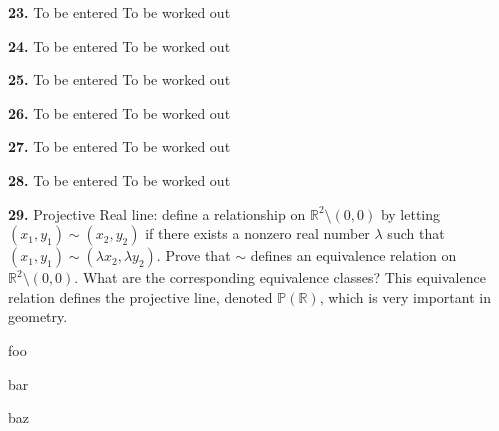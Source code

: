 \documentclass[12pt]{amsart}
\newenvironment{statement}[1]{\smallskip\noindent\color[rgb]{1.00,0.00,0.50} {\bf #1.}}{}
\theoremstyle{definition}
\theoremstyle{remark}
\newcommand{\BR}{\mathbb R}
\begin{document}
\begin{statement}{23}
To be entered
\end{statement}
To be worked out


\begin{statement}{24}
To be entered
\end{statement}
To be worked out


\begin{statement}{25}
To be entered
\end{statement}
To be worked out


\begin{statement}{26}
To be entered
\end{statement}
To be worked out


\begin{statement}{27}
To be entered
\end{statement}
To be worked out


\begin{statement}{28}
To be entered
\end{statement}
To be worked out


\begin{statement}{29}
Projective Real line: define a relationship on $\BR^2 \setminus (0,0)$
by letting $(x_1,y_1) \sim (x_2,y_2)$ if there exists a nonzero real
number $\lambda$ such that $(x_1,y_1) \sim (\lambda x_2,\lambda
y_2)$. Prove that $\sim$ defines an equivalence relation on
$\BR^2 \setminus (0,0)$. What are the corresponding equivalence
classes? This equivalence relation defines the projective line,
denoted $\mathbb{P}(\BR)$, which is very important in geometry.

\end{statement}

foo

bar

baz
\end{document}

